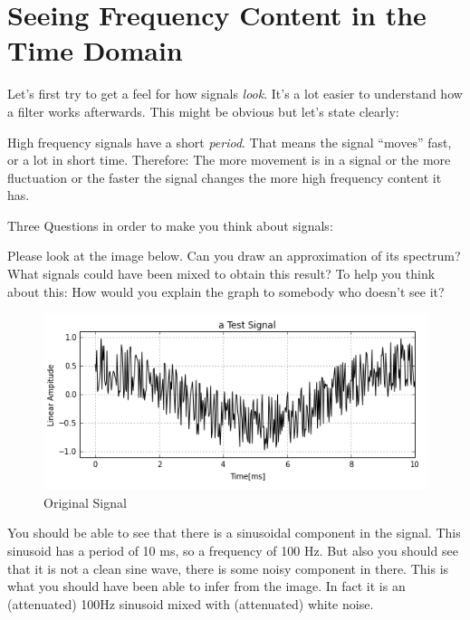 \section{Seeing Frequency Content in the Time Domain}

Let's first try to get a feel for how signals \textit{look}. It's a lot easier to understand how a filter works afterwards. This might be obvious but let's state clearly:

\begin{framed}
	High frequency signals have a short \textit{period}. That means the signal ``moves'' fast, or a lot in short time. Therefore: The more movement is in a signal or the more fluctuation or the faster the signal changes the more high frequency content it has.
\end{framed}


Three Questions in order to make you think about signals:


\begin{question}
	Please look at the image below. Can you draw an approximation of its spectrum? What signals could have been mixed to obtain this result? To help you think about this: How would you explain the graph to somebody who doesn't see it?
\begin{figure}[H]
	\begin{center}
		\includegraphics[width = 14cm]{raetsel_original.png}
		\caption{Original Signal}
		\label{fig:originalSignal}
	\end{center}
\end{figure}
\end{question}


\begin{Answer}
You should be able to see that there is a sinusoidal component in the signal. This sinusoid has a period of 10 ms, so a frequency of 100 Hz. But also you should see that it is not a clean sine wave, there is some noisy component in there. This is what you should have been able to infer from the image. In fact it is an (attenuated) 100Hz sinusoid mixed with (attenuated) white noise.
\end{Answer}


